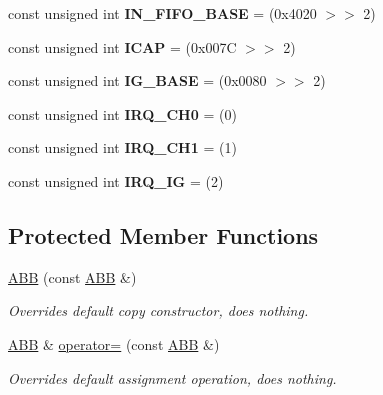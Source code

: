 \begin{CompactItemize}
\item 
\hypertarget{classmprace_1_1ABB_s11}{
const unsigned int {\bf IN\_\-FIFO\_\-BASE} = (0x4020 $>$$>$ 2)}
\label{classmprace_1_1ABB_s11}

\item 
\hypertarget{classmprace_1_1ABB_s12}{
const unsigned int {\bf ICAP} = (0x007C $>$$>$ 2)}
\label{classmprace_1_1ABB_s12}

\item 
\hypertarget{classmprace_1_1ABB_s13}{
const unsigned int {\bf IG\_\-BASE} = (0x0080 $>$$>$ 2)}
\label{classmprace_1_1ABB_s13}

\item 
\hypertarget{classmprace_1_1ABB_s14}{
const unsigned int {\bf IRQ\_\-CH0} = (0)}
\label{classmprace_1_1ABB_s14}

\item 
\hypertarget{classmprace_1_1ABB_s15}{
const unsigned int {\bf IRQ\_\-CH1} = (1)}
\label{classmprace_1_1ABB_s15}

\item 
\hypertarget{classmprace_1_1ABB_s16}{
const unsigned int {\bf IRQ\_\-IG} = (2)}
\label{classmprace_1_1ABB_s16}

\end{CompactItemize}
\subsection*{Protected Member Functions}
\begin{CompactItemize}
\item 
\hyperlink{classmprace_1_1ABB_b0}{ABB} (const \hyperlink{classmprace_1_1ABB}{ABB} \&)
\begin{CompactList}\small\item\em Overrides default copy constructor, does nothing. \item\end{CompactList}\item 
\hyperlink{classmprace_1_1ABB}{ABB} \& \hyperlink{classmprace_1_1ABB_b1}{operator=} (const \hyperlink{classmprace_1_1ABB}{ABB} \&)
\begin{CompactList}\small\item\em Overrides default assignment operation, does nothing. \item\end{CompactList}\end{CompactItemize}
